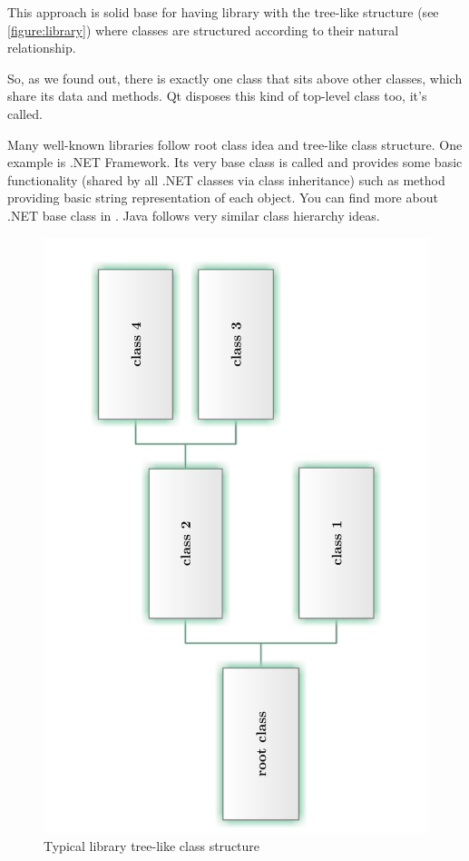 This approach is solid base for having library with the tree-like structure (see \autoref{figure:library}) where classes are structured according to their natural relationship.

So, as we found out, there is exactly one class that sits above other classes, which share its data and methods. Qt disposes this kind of top-level class too, it's called.

\begin{fdocextra}
Many well-known libraries follow root class idea and tree-like class structure. One example is .NET Framework. Its very base class is called and provides some basic functionality (shared by all .NET classes via class inheritance) such as method providing basic string representation of each object. You can find more about .NET base class in \citep[p.~84]{nigel:csharp}. Java follows very similar class hierarchy ideas.
\end{fdocextra}

\begin{figure}[ht]
\centering
\includegraphics[angle=-90,width=14cm]{graphics/laboratory/02-tree.pdf}
\caption{Typical library tree-like class structure}\label{figure:library}
\end{figure}